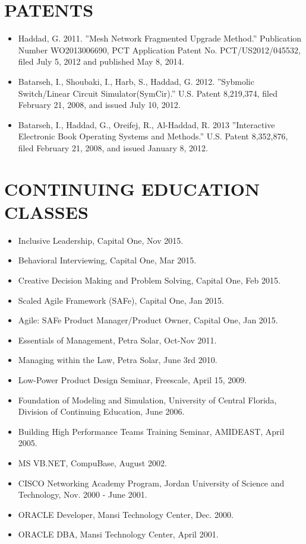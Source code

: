 \documentclass[line,margin]{res}
\begin{document}
\begin{resume}
\section{PATENTS}
\begin{itemize} \itemsep -2pt
     \item Haddad, G. 2011. ''Mesh Network Fragmented Upgrade Method.''
     Publication Number WO2013006690, PCT Application Patent No.
     PCT/US2012/045532, filed July 5, 2012 and published May 8, 2014.
     \item Batarseh, I., Shoubaki, I., Harb, S., Haddad, G. 2012. ''Sybmolic
     Switch/Linear Circuit Simulator(SymCir).'' U.S. Patent 8,219,374, filed
     February 21, 2008, and issued July 10, 2012.
     \item Batarseh, I., Haddad, G., Oreifej, R., Al-Haddad, R. 2013
     ''Interactive Electronic Book Operating Systems and Methods.''
     U.S. Patent 8,352,876, filed February 21, 2008, and issued January 8,
     2012.
\end{itemize}

\section{CONTINUING EDUCATION CLASSES}
\begin{itemize} \itemsep -2pt
     \item Inclusive Leadership, Capital One, Nov 2015.
     \item Behavioral Interviewing, Capital One, Mar 2015.
     \item Creative Decision Making and Problem Solving, Capital One, Feb 2015.
     \item Scaled Agile Framework (SAFe), Capital One, Jan 2015.
     \item Agile: SAFe Product Manager/Product Owner, Capital One, Jan 2015.
     \item Essentials of Management, Petra Solar, Oct-Nov 2011.
     \item Managing within the Law, Petra Solar, June 3rd 2010.
     \item Low-Power Product Design Seminar, Freescale, April 15, 2009.
     \item Foundation of Modeling and Simulation, University of Central
     Florida, Division of Continuing Education, June 2006.
     \item Building High Performance Teams Training Seminar, AMIDEAST, April
     2005.
     \item MS VB.NET, CompuBase, August 2002.
     \item CISCO Networking Academy Program, Jordan University of Science and
     Technology, Nov. 2000 - June 2001.
     \item ORACLE Developer, Mansi Technology Center, Dec. 2000.
     \item ORACLE DBA, Mansi Technology Center, April 2001.
\end{itemize}


\end{resume}
\end{document}
